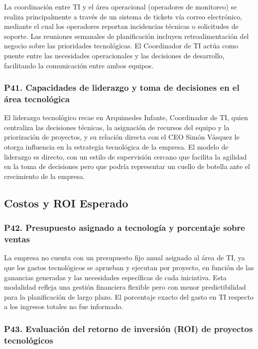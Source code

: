 \documentclass[12pt]{article}
\begin{document}
La coordinaci\'on entre TI y el \'area operacional (operadores de monitoreo) se realiza
principalmente a trav\'es de un sistema de tickets v\'ia correo electr\'onico,
mediante el cual los operadores reportan incidencias t\'ecnicas o solicitudes de soporte.
Las reuniones semanales de planificaci\'on incluyen retroalimentaci\'on del negocio sobre
las prioridades tecnol\'ogicas. El Coordinador de TI act\'ua como puente entre las
necesidades operacionales y las decisiones de desarrollo, facilitando la comunicaci\'on
entre ambos equipos.

\subsubsection*{\textbf{P41. Capacidades de liderazgo y toma de decisiones en el \'area tecnol\'ogica}}

El liderazgo tecnol\'ogico recae en Arquimedes Infante, Coordinador de TI, quien
centraliza las decisiones t\'ecnicas, la asignaci\'on de recursos del equipo y la
priorizaci\'on de proyectos, y su relaci\'on directa con el CEO Sim\'on V\'asquez le otorga
influencia en la estrategia tecnol\'ogica de la empresa. El modelo de liderazgo es directo, con un estilo de supervisi\'on cercano que facilita la agilidad en la
toma de decisiones pero que podr\'ia representar un cuello de botella ante el crecimiento
de la empresa.

\subsection{Costos y ROI Esperado}

\subsubsection*{\textbf{P42. Presupuesto asignado a tecnolog\'ia y porcentaje sobre ventas}}

La empresa no cuenta con un presupuesto fijo anual asignado al \'area de TI, ya que los gastos
tecnol\'ogicos se aprueban y ejecutan por proyecto, en funci\'on de las ganancias
generadas y las necesidades espec\'ificas de cada iniciativa. Esta modalidad refleja una
gesti\'on financiera flexible pero con menor predictibilidad para la planificaci\'on de
largo plazo. El porcentaje exacto del gasto en TI respecto a los ingresos totales no fue
informado.

\subsubsection*{\textbf{P43. Evaluaci\'on del retorno de inversi\'on (ROI) de proyectos tecnol\'ogicos}}
\end{document}
